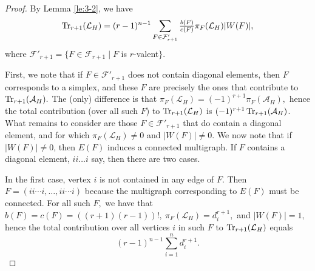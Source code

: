 \documentclass[11pt]{article}
\def\Tr{\mathop{\rm Tr }\nolimits}
\begin{document}
\begin{proof}  By Lemma \ref{le:3-2}, we have $$\Tr_{r+1}(\mathcal{L}_{H})=(r-1)^{n-1}\sum_{F\in \mathcal{F}'_{r+1}}\tfrac{b(F)}{c(F)}\pi_{F}(\mathcal{L}_{H})\lvert W(F)\rvert,$$
where $\mathcal{F}'_{r+1}=\{F\in  \mathcal{F}_{r+1} \mid F$ is $r$-valent$\}.$

First, we note that if $F\in \mathcal{F}'_{r+1}$ does not contain diagonal elements, then $F$ corresponds to a simplex, and these $F$ are precisely the ones that contribute to $\Tr_{r+1}(\mathcal{A}_{H}).$ The (only) difference is that $\pi_{F}(\mathcal{L}_{H})=(-1)^{r+1}\pi_{F}(\mathcal{A}_{H}),$ hence the total contribution (over all such $F$) to $\Tr_{r+1}(\mathcal{L}_{H})$ is $(-1)^{r+1}\Tr_{r+1}(\mathcal{A}_{H})$. What remains to consider are those $F\in \mathcal{F}'_{r+1}$ that do contain a diagonal element, and for which  $\pi_{F}(\mathcal{L}_{H})\neq 0$ and $\lvert W(F)\rvert\neq 0.$ We now note that if $\lvert W(F)\rvert\neq 0$, then $E(F)$ induces a connected multigraph. If $F$ contains a diagonal element, $ii \ldots i$ say, then there are two cases.

In the first case, vertex $i$ is not contained in any edge of $F$. Then $F=(ii\cdots i, \ldots, ii\cdots i)$ because the multigraph corresponding to $E(F)$ must be connected. For all such $F,$ we have that $b(F)=c(F)=((r+1)(r-1))!, ~\pi_{F}(\mathcal{L}_{H})=d_{i}^{r+1},$ and $\lvert W(F)\rvert=1,$ hence the total contribution over all vertices $i$ in such $F$ to $\Tr_{r+1}(\mathcal{L}_{H})$ equals $$(r-1)^{n-1}\sum_{i=1}^{n}d_{i}^{r+1}.$$


\end{proof}
\end{document}
